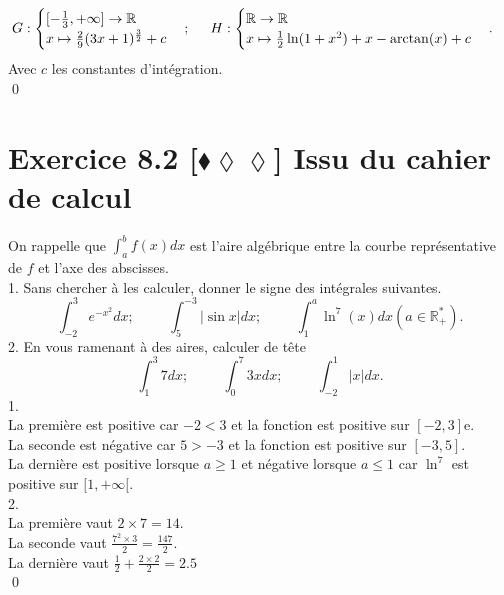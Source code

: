\documentclass[10pt]{article}
\begin{document}
\begin{tcolorbox}[enhanced, width=7in, center, size=fbox, fontupper=\large, drop shadow southwest]
\begin{align*}
        &G:\begin{cases}[-\frac{1}{3}, +\infty]\rightarrow\mathbb{R}\\x\mapsto\frac{2}{9}(3x+1)^{\frac{3}{2}} + c\end{cases}; \hspace{0.5cm}H:\begin{cases}\mathbb{R}\rightarrow\mathbb{R}\\x\mapsto\frac{1}{2}\ln(1+x^2) + x - \arctan(x) + c\end{cases}.
    \end{align*}
    Avec $c$ les constantes d'intégration.\\
    \qed
\end{tcolorbox}


\section*{Exercice 8.2 [$\blacklozenge\lozenge\lozenge$] Issu du cahier de calcul}
\begin{tcolorbox}[enhanced, width=7in, center, size=fbox, fontupper=\large, drop shadow southwest]
    On rappelle que $\int_a^b{f(x)dx}$ est l'aire algébrique entre la courbe représentative de $f$ et l'axe des abscisses.\\
    1. Sans chercher à les calculer, donner le signe des intégrales suivantes.
    \begin{equation*}
        \int_{-2}^3{e^{-x^2}dx}; \hspace{1cm} \int_5^{-3}{|\sin x|dx}; \hspace{1cm} \int_1^a{\ln^7(x)dx} (a\in\mathbb{R_+^*}).
    \end{equation*}
    2. En vous ramenant à des aires, calculer de tête
    \begin{equation*}
        \int_1^3{7dx}; \hspace{1cm} \int_0^7{3xdx}; \hspace{1cm} \int_{-2}^1{|x|dx}.
    \end{equation*}
    1.\\
    La première est positive car $-2<3$ et la fonction est positive sur $[-2,3]$e.\\
    La seconde est négative car $5>-3$ et la fonction est positive sur $[-3,5]$.\\
    La dernière est positive lorsque $a\geq1$ et négative lorsque $a\leq1$ car $\ln^7$ est positive sur $[1,+\infty[$.\\
    2.\\
    La première vaut $2\times7=14$.\\
    La seconde vaut $\frac{7^2\times3}{2}=\frac{147}{2}$.\\
    La dernière vaut $\frac{1}{2}+\frac{2\times2}{2}=2.5$\\
    \qed
\end{tcolorbox}
\end{document}
